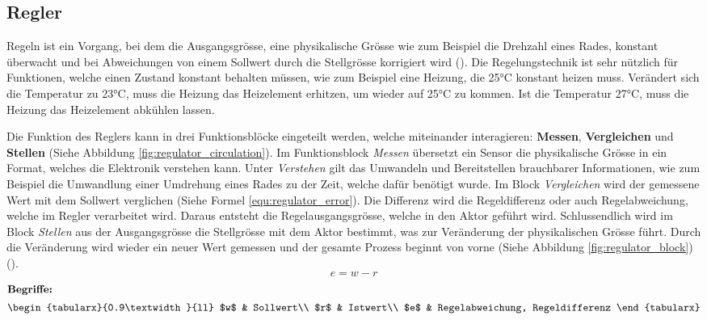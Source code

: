 \subsection{Regler} \label{cap:einlesung_regler}
Regeln ist ein Vorgang, bei dem die Ausgangsgrösse, eine physikalische Grösse wie zum Beispiel die Drehzahl eines Rades, konstant überwacht und bei Abweichungen von einem Sollwert durch die Stellgrösse korrigiert wird (\cite{regelungstechnik}). Die Regelungstechnik ist sehr nützlich für Funktionen, welche einen Zustand konstant behalten müssen, wie zum Beispiel eine Heizung, die 25°C konstant heizen muss. Verändert sich die Temperatur zu 23°C, muss die Heizung das Heizelement erhitzen, um wieder auf 25°C zu kommen. Ist die Temperatur 27°C, muss die Heizung das Heizelement abkühlen lassen.



Die Funktion des Reglers kann in drei Funktionsblöcke eingeteilt werden, welche miteinander interagieren: \textbf{Messen}, \textbf{Vergleichen} und \textbf{Stellen} (Siehe Abbildung \ref{fig:regulator_circulation}). Im Funktionsblock  \textit{Messen} übersetzt ein Sensor die physikalische Grösse in ein Format, welches die Elektronik verstehen kann. Unter \textit{Verstehen} gilt das Umwandeln und Bereitstellen brauchbarer Informationen, wie zum Beispiel die Umwandlung einer Umdrehung eines Rades zu der Zeit, welche dafür benötigt wurde. Im Block \textit{Vergleichen} wird der gemessene Wert mit dem Sollwert verglichen (Siehe Formel \ref{equ:regulator_error}). Die Differenz wird die Regeldifferenz oder auch Regelabweichung, welche im Regler verarbeitet wird. Daraus entsteht die Regelausgangsgrösse, welche in den Aktor geführt wird. Schlussendlich wird im Block \textit{Stellen} aus der Ausgangsgrösse die Stellgrösse mit dem Aktor bestimmt, was zur Veränderung der physikalischen Grösse führt. Durch die Veränderung wird wieder ein neuer Wert gemessen und der gesamte Prozess beginnt von vorne (Siehe Abbildung \ref{fig:regulator_block})(\cite{regelungstechnik}).
\newpage
\begin{equation}
  \label{equ:regulator_error}
  e = w-r
\end{equation}
\begin{gather}
  \shortintertext{\textbf{Begriffe:}}
  \begin{tabularx}{0.9\textwidth}{ll}
    $w$ & Sollwert\\
    $r$ & Istwert\\
    $e$ & Regelabweichung, Regeldifferenz
  \end{tabularx}\nonumber
\end{gather}

